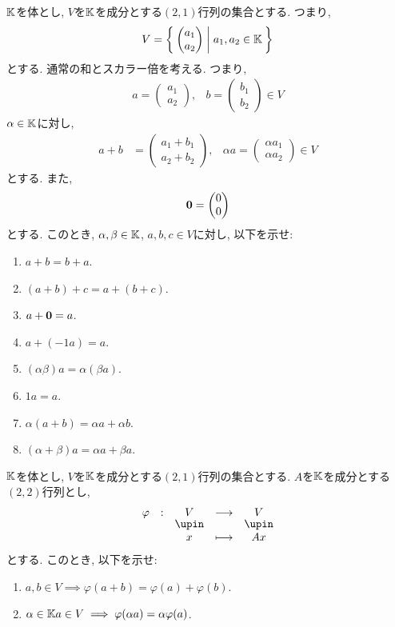 \begin{quiz}
  $\mathbb{K}$を体とし, $V$を$\mathbb{K}$を成分とする$(2,1)$行列の集合とする.
  つまり,
  \begin{align*}
    V=\Set{\begin{pmatrix}a_1\\a_2\end{pmatrix}|a_1,a_2\in \mathbb{K}}
  \end{align*}
  とする. 通常の和とスカラー倍を考える.  つまり,
  \begin{align*}
    a=\begin{pmatrix}a_1\\a_2\end{pmatrix}, & b=\begin{pmatrix}b_1\\b_2\end{pmatrix} \in V
  \end{align*}
  $\alpha\in\mathbb{K}$に対し,
  \begin{align*}
    a+b&=\begin{pmatrix}a_1+b_1\\a_2+b_2\end{pmatrix}, & \alpha a=\begin{pmatrix}\alpha a_1\\\alpha a_2\end{pmatrix} \in V
  \end{align*}
  とする. また,
  \begin{align*}
  \boldsymbol{0}=
  \begin{pmatrix}
    0\\0
  \end{pmatrix}
  \end{align*}
  とする.
  このとき, $\alpha,\beta\in\mathbb{K}$, $a,b,c\in V$に対し, 以下を示せ:
  \begin{enumerate}
    \item $a+b=b+a$.
    \item $(a+b)+c=a+(b+c)$.
    \item $a+\boldsymbol{0}=a$.
    \item $a+(-1 a)=a$.
    \item $(\alpha\beta)a=\alpha(\beta a)$.
    \item $1a=a$.
    \item $\alpha(a+b)=\alpha a+\alpha b$.
    \item $(\alpha+\beta)a=\alpha a+\beta a$.
  \end{enumerate}
\end{quiz}

\begin{quiz}
  $\mathbb{K}$を体とし, $V$を$\mathbb{K}$を成分とする$(2,1)$行列の集合とする.
  $A$を$\mathbb{K}$を成分とする$(2,2)$行列とし,
  \begin{align*}
    \shazo{\varphi}{V}{V}{x}{Ax}
  \end{align*}
  とする.
  このとき, 以下を示せ:
  \begin{enumerate}
    \item $a,b\in V\implies \varphi(a+b)=\varphi(a)+\varphi(b)$.
    \item $\alpha\in\mathbb{K} a\in V\implies \varphi(\alpha a)=\alpha\varphi(a)$.
  \end{enumerate}
\end{quiz}


